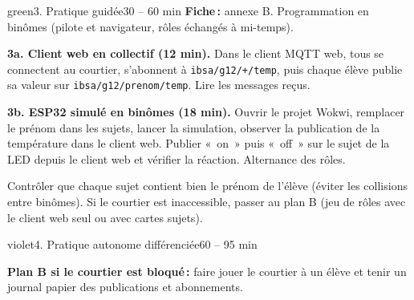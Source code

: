 \documentclass[11pt,a4paper]{article}
\begin{document}
\begin{etape}{green}{3. Pratique guidée}{30 -- 60 min}
\textbf{Fiche\,:} annexe B. Programmation en binômes (pilote et navigateur, rôles échangés à mi-temps).

\textbf{3a. Client web en collectif (12 min).} Dans le client MQTT web, tous se connectent au courtier, s'abonnent à \texttt{ibsa/g12/+/temp}, puis chaque élève publie sa valeur sur \texttt{ibsa/g12/prenom/temp}. Lire les messages reçus.

\textbf{3b. ESP32 simulé en binômes (18 min).} Ouvrir le projet Wokwi, remplacer le prénom dans les sujets, lancer la simulation, observer la publication de la température dans le client web. Publier «~on~» puis «~off~» sur le sujet de la LED depuis le client web et vérifier la réaction. Alternance des rôles.


\begin{astuce}
Contrôler que chaque sujet contient bien le prénom de l'élève (éviter les collisions entre binômes). Si le courtier est inaccessible, passer au plan B (jeu de rôles avec le client web seul ou avec cartes sujets).
\end{astuce}
\end{etape}

\begin{etape}{violet}{4. Pratique autonome différenciée}{60 -- 95 min}

\medskip
\textbf{Plan B si le courtier est bloqué\,:} faire jouer le courtier à un élève et tenir un journal papier des publications et abonnements.
\end{etape}
\end{document}
